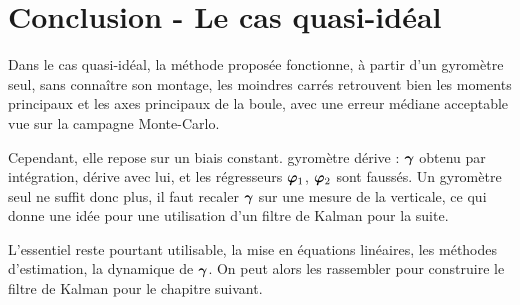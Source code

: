 \section{Conclusion - Le cas quasi-idéal}

Dans le cas quasi-idéal, la méthode proposée fonctionne, à partir d'un gyromètre seul, sans connaître son montage, les moindres carrés retrouvent bien les moments principaux et les axes principaux de la boule, avec une erreur médiane acceptable vue sur la campagne Monte-Carlo.

Cependant, elle repose sur un biais constant. gyromètre dérive : $\bm{\gamma}$ obtenu par intégration, dérive avec lui, et les régresseurs $\bm{\varphi}_1$, $\bm{\varphi}_2$ sont faussés. Un gyromètre seul ne suffit donc plus, il faut recaler
$\bm{\gamma}$ sur une mesure de la verticale, ce qui donne une idée pour une utilisation d'un filtre de Kalman pour la suite.

L'essentiel reste pourtant utilisable, la mise en équations linéaires, les méthodes d'estimation, la dynamique de $\bm{\gamma}$. On peut alors les rassembler pour construire le filtre de Kalman pour le chapitre suivant.